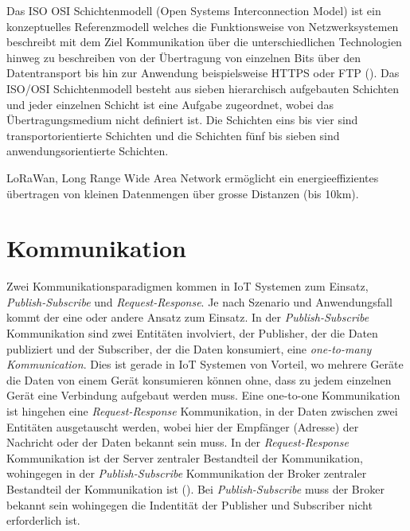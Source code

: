 \documentclass[
  11pt,
  a4paperpaper,
  oneside, openany  ,captions=tableheading
]{scrbook}
\providecommand{\tightlist}{%
  \setlength{\itemsep}{0pt}\setlength{\parskip}{0pt}}
\theoremstyle{definition}
\theoremstyle{remark}
\begin{document}
\begin{description}
\tightlist
\item[ISO OSI Schichtenmodell\index{ISO/OSI Schichtenmodell}]
Das ISO OSI Schichtenmodell (Open Systems Interconnection Model) ist ein
konzeptuelles Referenzmodell welches die Funktionsweise von
Netzwerksystemen beschreibt mit dem Ziel Kommunikation über die
unterschiedlichen Technologien hinweg zu beschreiben von der Übertragung
von einzelnen Bits über den Datentransport bis hin zur Anwendung
beispielsweise HTTPS oder FTP (). Das
ISO/OSI Schichtenmodell besteht aus sieben hierarchisch aufgebauten
Schichten und jeder einzelnen Schicht ist eine Aufgabe zugeordnet, wobei
das Übertragungsmedium nicht definiert ist. Die Schichten eins bis vier
sind transportorientierte Schichten und die Schichten fünf bis sieben
sind anwendungsorientierte Schichten.
\item[Long Range Wide Area Network (LoRaWAN) oder LoRa\index{LoRaWAN}]
LoRaWan, Long Range Wide Area Network ermöglicht ein energieeffizientes
übertragen von kleinen Datenmengen über grosse Distanzen (bis 10km).
\end{description}

\section{Kommunikation}\label{kommunikation}

Zwei Kommunikationsparadigmen kommen in IoT Systemen zum Einsatz,
\emph{Publish-Subscribe} und \emph{Request-Response}. Je nach Szenario
und Anwendungsfall kommt der eine oder andere Ansatz zum Einsatz. In der
\emph{Publish-Subscribe} Kommunikation sind zwei Entitäten involviert,
der Publisher, der die Daten publiziert und der Subscriber, der die
Daten konsumiert, eine \emph{one-to-many Kommunication}. Dies ist gerade
in IoT Systemen von Vorteil, wo mehrere Geräte die Daten von einem Gerät
konsumieren können ohne, dass zu jedem einzelnen Gerät eine Verbindung
aufgebaut werden muss. Eine one-to-one Kommunikation ist hingehen eine
\emph{Request-Response} Kommunikation, in der Daten zwischen zwei
Entitäten ausgetauscht werden, wobei hier der Empfänger (Adresse) der
Nachricht oder der Daten bekannt sein muss. In der
\emph{Request-Response} Kommunikation ist der Server zentraler
Bestandteil der Kommunikation, wohingegen in der
\emph{Publish-Subscribe} Kommunikation der Broker zentraler Bestandteil
der Kommunikation ist (). Bei
\emph{Publish-Subscribe} muss der Broker bekannt sein wohingegen die
Indentität der Publisher und Subscriber nicht erforderlich ist.
\end{document}
